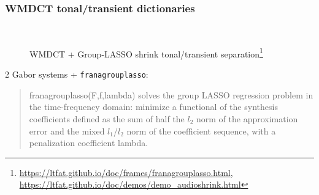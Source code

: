\documentclass[usenames,dvipsnames]{beamer}
\begin{document}
\begin{frame}[fragile]
	\frametitle{WMDCT tonal/transient dictionaries}
	\begin{figure}[ht]
		\vspace{-1em}
		\\
		\caption{WMDCT + Group-LASSO shrink tonal/transient separation\footnote{\url{https://ltfat.github.io/doc/frames/franagrouplasso.html}, \url{https://ltfat.github.io/doc/demos/demo_audioshrink.html}}}
		\vspace{-1em}
	\end{figure}
	2 Gabor systems + \Verb#franagrouplasso#:
	\begin{quote}
		franagrouplasso(F,f,lambda) solves the group LASSO regression problem in the time-frequency domain: minimize a functional of the synthesis coefficients defined as the sum of half the $\mathit{l}_{2}$ norm of the approximation error and the mixed $\mathit{l}_{1}$/$\mathit{l}_{2}$ norm of the coefficient sequence, with a penalization coefficient lambda.
	\end{quote}
\end{frame}
\end{document}
